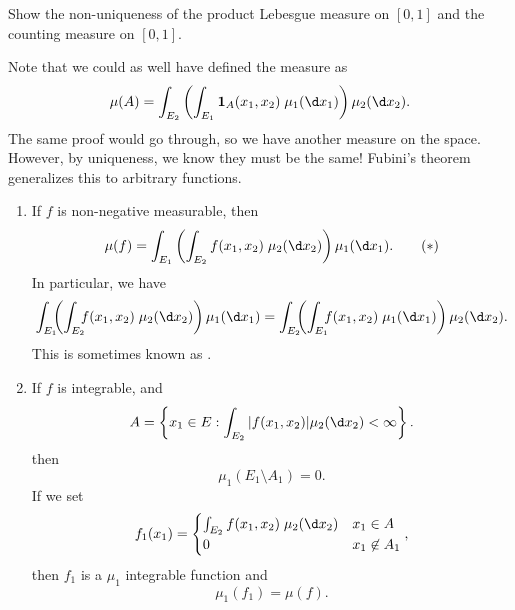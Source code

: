 \documentclass[a4paper]{article}
\begin{document}
\begin{ex}
  Show the non-uniqueness of the product Lebesgue measure on $[0, 1]$ and the counting measure on $[0, 1]$.
\end{ex}

Note that we could as well have defined the measure as
\[
  \mu(A) = \int_{E_2} \left(\int_{E_1} \mathbf{1}_A(x_1, x_2)\;\mu_1(\d x_1)\right)\mu_2(\d x_2).
\]
The same proof would go through, so we have another measure on the space. However, by uniqueness, we know they must be the same! Fubini's theorem generalizes this to arbitrary functions.
\begin{thm}\leavevmode
  \begin{enumerate}
    \item If $f$ is non-negative measurable, then
      \[
        \mu(f) = \int_{E_1} \left(\int_{E_2} f(x_1, x_2)\; \mu_2(\d x_2)\right)\mu_1(\d x_1).\tag{$*$}
      \]
      In particular, we have
      \[
        \int_{E_1}\!\!\!\left(\int_{E_2}\!\!\! f(x_1, x_2)\; \mu_2(\d x_2)\right)\mu_1(\d x_1) = \int_{E_2}\!\!\!\left(\int_{E_1}\!\!\!f(x_1, x_2)\; \mu_1(\d x_1)\right)\mu_2(\d x_2).
      \]
      This is sometimes known as .
    \item If $f$ is integrable, and
      \[
        A = \left\{x_1 \in E: \int_{E_2}|f(x_1, x_2)| \mu_2(\d x_2) < \infty\right\}.
      \]
      then
      \[
        \mu_1(E_1 \setminus A_1) = 0.
      \]
      If we set
      \[
        f_1(x_1) =
        \begin{cases}
          \int_{E_2}f(x_1, x_2) \;\mu_2(\d x_2) & x_1 \in A\\
          0 & x_1 \not\in A_1
        \end{cases},
      \]
      then $f_1$ is a $\mu_1$ integrable function and
      \[
        \mu_1(f_1) = \mu(f).
      \]
  \end{enumerate}
\end{thm}
\end{document}

